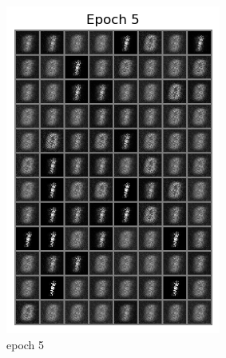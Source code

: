 \documentclass[a4paper]{article}
\theoremstyle{definition}
\newenvironment{soln}{
	\leavevmode\color{blue}\ignorespaces
}{}
\begin{document}
\begin{enumerate} [label=(\alph*)]
\begin{soln}
		\begin{figure}[H]
			\centering
			\begin{subfigure}[b]{0.3\textwidth}
				\centering
				\includegraphics[width=\textwidth]{1-Epoch5.png}
				\caption{epoch 5}
			\end{subfigure}
			\hfill
			\begin{subfigure}[b]{0.3\textwidth}
				\centering

\end{subfigure}
\end{figure}
\end{soln}
\end{enumerate}
\end{document}
